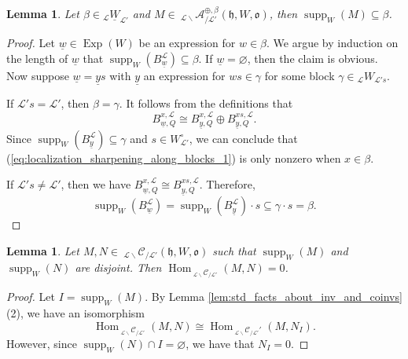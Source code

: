 \documentclass{amsart}
\newcommand{\scrL}{\mathcal{L}}
\DeclareMathOperator{\Hom}{Hom}
\DeclareMathOperator{\supp}{supp}
\newcommand{\fr}[1]{\mathfrak{#1}}
\newcommand{\Cmon}[2]{\:_{#1 \backslash} \mathcal{C}_{/ #2} }
\newcommand{\Amon}[2]{\:_{#1 \backslash} \mathcal{A}_{/ #2} }
\DeclareMathOperator{\Exp}{Exp}
\newcommand{\W}[2]{{}_{#1}W_{#2}}
\newcommand{\uW}[2]{{}_{#1}\underline{W}_{#2}}
\newcommand{\uw}{\underline{w}}
\newcommand{\uy}{\underline{y}}
\renewcommand{\emptyset}{\varnothing}
\newtheorem{lemma}[subsubsection]{Lemma}
\theoremstyle{definition}
\numberwithin{equation}{subsection}
\begin{document}
\begin{lemma}\label{lem:localization_sharpening_along_blocks}
    Let $\beta \in \uW{\scrL}{\scrL'}$ and $M \in \Amon{\scrL}{\scrL'}^{\oplus, \beta} (\fr{h}, W, \fr{o})$, then $\supp_W (M) \subseteq \beta$.
\end{lemma}
\begin{proof}
    Let $\uw\in \Exp (W)$ be an expression for $w \in \beta$. 
    We argue by induction on the length of $\uw$ that $\supp_W (B_{\uw}^{\scrL}) \subseteq \beta$.
    If $\uw = \emptyset$, then the claim is obvious.
    Now suppose $\uw = \uy s$ with $\uy$ an expression for $ws \in \gamma$ for some block $\gamma \in \W{\scrL}{\scrL' s}$.
    
    If $\scrL' s = \scrL'$, then $\beta = \gamma$.
    It follows from the definitions that
    \begin{equation}\label{eq:localization_sharpening_along_blocks_1} B_{\uw, Q}^{x, \scrL} \cong B_{\uy, Q}^{x, \scrL} \oplus B_{\uy, Q}^{xs, \scrL}.\end{equation}
    Since $\supp_W \left( B_{\uy}^{\scrL}\right) \subseteq \gamma$ and $s \in W_{\scrL'}^{\circ}$, we can conclude that (\ref{eq:localization_sharpening_along_blocks_1}) is only nonzero when $x \in \beta$.

    If $\scrL' s \neq \scrL'$, then we have $B_{\uw, Q}^{x, \scrL} \cong B_{\uy, Q}^{xs, \scrL}$.
    Therefore, 
    \[ \supp_W \left( B_{\uw}^{\scrL}\right) = \supp_W (B_{\uy}^{\scrL}) \cdot s \subseteq \gamma \cdot s = \beta. \]
\end{proof}

\begin{lemma}\label{lem:disjoint_support_implies_Hom_vanishing}
    Let $M, N \in \Cmon{\scrL}{\scrL'} (\fr{h}, W, \fr{o})$ such that $\supp_W (M)$ and $\supp_W (N)$ are disjoint. Then $\Hom_{\Cmon{\scrL}{\scrL'}} (M,N) = 0$.
\end{lemma}
\begin{proof}
    Let $I = \supp_W (M)$.
    By Lemma \ref{lem:std_facts_about_inv_and_coinvs} (2), we have an isomorphism 
    \[\Hom_{\Cmon{\scrL}{\scrL'}} (M,N) \cong \Hom_{\Cmon{\scrL}{\scrL'}'} (M, N_I).\]
    However, since $\supp_W (N) \cap I = \emptyset$, we have that $N_I = 0$. 
\end{proof}
\end{document}

